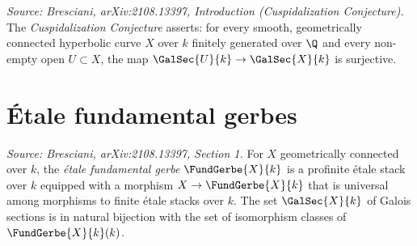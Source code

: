 \begin{definition}[CuspidalizationConj]
  \label{def:cuspidalization}
  \textit{Source: Bresciani, arXiv:2108.13397, Introduction (Cuspidalization Conjecture).}
  The \emph{Cuspidalization Conjecture} asserts: for every smooth, geometrically
  connected hyperbolic curve \(X\) over \(k\) finitely generated over \(\Q\) and
  every non-empty open \(U \subset X\), the map \(\GalSec{U}{k} \to \GalSec{X}{k}\)
  is surjective.
\end{definition}

\section{Étale fundamental gerbes}


\begin{definition}[EtaleFundGerbe]
  \label{def:etale-fund-gerbe}
  \textit{Source: Bresciani, arXiv:2108.13397, Section 1.}
  For \(X\) geometrically connected over \(k\), the \emph{étale fundamental gerbe}
  \(\FundGerbe{X}{k}\) is a profinite étale stack over \(k\) equipped with a morphism
  \(X \to \FundGerbe{X}{k}\) that is universal among morphisms to finite étale stacks
  over \(k\). The set \(\GalSec{X}{k}\) of Galois sections is in natural bijection with
  the set of isomorphism classes of \(\FundGerbe{X}{k}(k)\).
\end{definition}

